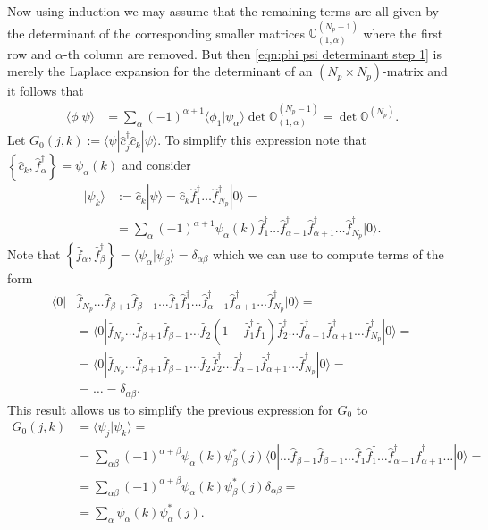 \documentclass[english, parskip=full]{scrartcl}
\newcommand{\brak}{}
\renewcommand{\braket}{}
\newcommand{\kla}{}
\newcommand{\klammer}{}
\newcommand{\Ket}{}
\begin{document}
Now using induction we may assume that the remaining terms are all given by the determinant of the corresponding smaller matrices $\mathbb{O}^{(N_p-1)}_{(1,\alpha)}$ where the first row and $\alpha$-th column are removed.
But then  \autoref{eqn:phi psi determinant step 1} is merely the Laplace expansion for the determinant of an $(N_p\times N_p)$-matrix and it follows that
\begin{align}
\brak\langle \phi | \psi \rangle &= \sum_{\alpha} (-1)^{\alpha+1} \brak\langle \phi_1 | \psi_\alpha \rangle \det \mathbb{O}^{(N_p-1)}_{(1,\alpha)} = \det \mathbb{O}^{(N_p)}.
\end{align}
Let $G_0(j,k) := \braket\langle \psi | \hat{c}_j^\dagger \hat{c}_k | \psi \rangle$.
To simplify this expression note that $\klammer\left\{ \hat{c}_k, \hat{f}_\alpha^\dagger \right\} = \psi_\alpha(k)$ and consider
\begin{align}
\Ket | \psi_k \rangle &:= \hat{c}_k\Ket | \psi \rangle = \hat{c}_k \hat{f}_1^\dagger \dots \hat{f}_{N_p}^\dagger \Ket | 0 \rangle = \\
&= \sum_{\alpha} (-1)^{\alpha + 1} \psi_\alpha(k) \hat{f}_1^\dagger \dots \hat{f}_{\alpha-1}^\dagger \hat{f}_{\alpha+1}^\dagger \dots \hat{f}_{N_p}^\dagger \Ket | 0 \rangle.
\end{align}
Note that $\klammer\left\{ \hat{f}_\alpha, \hat{f}_\beta^\dagger \right\} = \brak\langle \psi_\alpha | \psi_\beta \rangle = \delta_{\alpha\beta}$ which we can use to compute terms of the form
\begin{align}
\braket\langle 0 | &\hat{f}_{N_p} \dots \hat{f}_{\beta+1} \hat{f}_{\beta-1} \dots \hat{f}_1 \hat{f}_1^\dagger \dots \hat{f}_{\alpha-1}^\dagger \hat{f}_{\alpha+1}^\dagger \dots \hat{f}_{N_p}^\dagger | 0 \rangle = \\
&= \langle 0 | \hat{f}_{N_p} \dots \hat{f}_{\beta+1} \hat{f}_{\beta-1} \dots \hat{f}_2 \kla\left( 1 - \hat{f}_1^\dagger \hat{f}_1 \right) \hat{f}_2^\dagger \dots \hat{f}_{\alpha-1}^\dagger \hat{f}_{\alpha+1}^\dagger \dots \hat{f}_{N_p}^\dagger | 0 \rangle = \\
&= \langle 0 | \hat{f}_{N_p} \dots \hat{f}_{\beta+1} \hat{f}_{\beta-1} \dots \hat{f}_2 \hat{f}_2^\dagger \dots \hat{f}_{\alpha-1}^\dagger \hat{f}_{\alpha+1}^\dagger \dots \hat{f}_{N_p}^\dagger | 0 \rangle = \\
&= \dots = \delta_{\alpha\beta}.
\end{align}
This result allows us to simplify the previous expression for $G_0$ to
\begin{align}
G_0(j,k) &= \brak\langle \psi_j | \psi_k \rangle = \\
&= \sum_{\alpha\beta} (-1)^{\alpha+\beta} \psi_\alpha(k) \psi^\ast_\beta(j) \braket\langle 0 | \dots \hat{f}_{\beta+1} \hat{f}_{\beta-1} \dots \hat{f}_1 \hat{f}_1^\dagger \dots \hat{f}_{\alpha-1}^\dagger \hat{f}_{\alpha+1}^\dagger \dots | 0 \rangle = \\
&= \sum_{\alpha\beta} (-1)^{\alpha+\beta} \psi_\alpha(k) \psi^\ast_\beta(j) \delta_{\alpha\beta} = \\
&= \sum_{\alpha} \psi_\alpha(k) \psi^\ast_\alpha(j).
\end{align}
\end{document}
